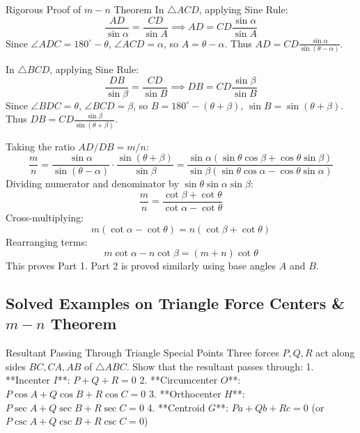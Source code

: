 \documentclass[11pt,a4paper]{article}
\begin{document}
\begin{proofbox}{Rigorous Proof of $m-n$ Theorem}
In $\triangle ACD$, applying Sine Rule:
\[
\frac{AD}{\sin\alpha} = \frac{CD}{\sin A} \implies AD = CD \frac{\sin\alpha}{\sin A}
\]
Since $\angle ADC = 180^\circ - \theta$, $\angle ACD = \alpha$, so $A = \theta - \alpha$.
Thus $AD = CD \frac{\sin\alpha}{\sin(\theta - \alpha)}$.

In $\triangle BCD$, applying Sine Rule:
\[
\frac{DB}{\sin\beta} = \frac{CD}{\sin B} \implies DB = CD \frac{\sin\beta}{\sin B}
\]
Since $\angle BDC = \theta$, $\angle BCD = \beta$, so $B = 180^\circ - (\theta + \beta)$, $\sin B = \sin(\theta + \beta)$.
Thus $DB = CD \frac{\sin\beta}{\sin(\theta + \beta)}$.

Taking the ratio $AD / DB = m / n$:
\[
\frac{m}{n} = \frac{\sin\alpha}{\sin(\theta - \alpha)} \cdot \frac{\sin(\theta + \beta)}{\sin\beta} = \frac{\sin\alpha(\sin\theta\cos\beta + \cos\theta\sin\beta)}{\sin\beta(\sin\theta\cos\alpha - \cos\theta\sin\alpha)}
\]
Dividing numerator and denominator by $\sin\theta \sin\alpha \sin\beta$:
\[
\frac{m}{n} = \frac{\cot\beta + \cot\theta}{\cot\alpha - \cot\theta}
\]
Cross-multiplying:
\[
m(\cot\alpha - \cot\theta) = n(\cot\beta + \cot\theta)
\]
Rearranging terms:
\[
m\cot\alpha - n\cot\beta = (m+n)\cot\theta
\]
This proves Part 1. Part 2 is proved similarly using base angles $A$ and $B$.
\end{proofbox}

\subsection{Solved Examples on Triangle Force Centers \& $m-n$ Theorem}

\begin{examplebox}{Resultant Passing Through Triangle Special Points}
Three forces $P, Q, R$ act along sides $BC, CA, AB$ of $\triangle ABC$. Show that the resultant passes through:
1. **Incenter $I$**: $P + Q + R = 0$
2. **Circumcenter $O$**: $P\cos A + Q\cos B + R\cos C = 0$
3. **Orthocenter $H$**: $P\sec A + Q\sec B + R\sec C = 0$
4. **Centroid $G$**: $Pa + Qb + Rc = 0$ (or $P\csc A + Q\csc B + R\csc C = 0$)
\end{examplebox}
\end{document}
